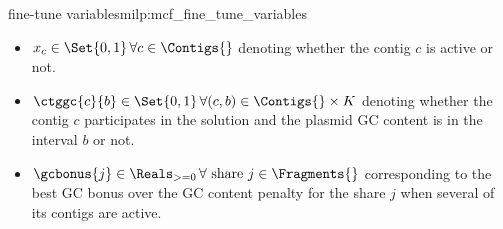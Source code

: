 \begin{definition}{\MCF{} fine-tune variables}{milp:mcf_fine_tune_variables}
    \begin{itemize}
        \item \(x_c \in \Set{0, 1} \, \forall c \in \Contigs{}\) denoting whether the contig \(c\) is active or not.
        \item \(\ctggc{c}{b} \in \Set{0, 1} \, \forall (c, b) \in \Contigs{} \times K\) denoting whether the contig \(c\) participates in the solution and the plasmid GC content is in the interval \(b\) or not. 
        \item \(\gcbonus{j} \in \Reals_{>=0} \, \forall \text{ share } j \in \Fragments{}\) corresponding to the best GC bonus over the GC content penalty for the share \(j\) when several of its contigs are active.
    \end{itemize}
\end{definition}


